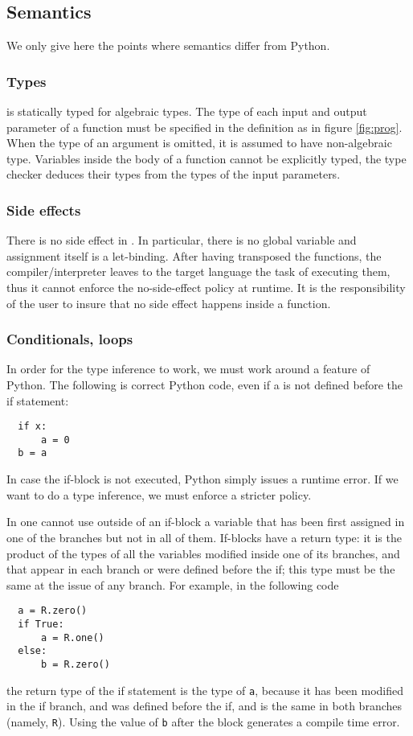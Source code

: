 \ifbfive\pagebreak\fi
\subsection{Semantics}
We only give here the points where \tALpy{} semantics differ from
Python.

\subsubsection{Types}
\tALpy{} is statically typed for algebraic types. The type of each
input and output parameter of a function must be specified in the
definition as in figure \ref{fig:prog}. When the type of an argument
is omitted, it is assumed to have non-algebraic type. Variables inside
the body of a function cannot be explicitly typed, the type checker
deduces their types from the types of the input parameters.

\subsubsection{Side effects}
There is no side effect in \tALpy{}. In particular, there is no global
variable and assignment itself is a let-binding. After having
transposed the functions, the \tALpy{} compiler/interpreter leaves to
the target language the task of executing them, thus it cannot enforce
the no-side-effect policy at runtime. It is the responsibility of the
user to insure that no side effect happens inside a \tALpy{} function.

\subsubsection{Conditionals, loops}
\label{sec:conditionals-loops}
In order for the type inference to work, we must work around a feature
of Python. The following is correct Python code, even if a is not
defined before the if statement:
\begin{lstlisting}
  if x:
      a = 0
  b = a
\end{lstlisting}
In case the if-block is not executed, Python simply issues a runtime
error. If we want to do a type inference, we must enforce a stricter
policy.

In \tALpy{} one cannot use outside of an if-block a variable that has
been first assigned in one of the branches but not in all of them.
If-blocks have a return type: it is the product of the types of all
the variables modified inside one of its branches, and that appear in
each branch or were defined before the if; this type must be the same
at the issue of any branch. For example, in the following code
\begin{lstlisting}
  a = R.zero()
  if True:
      a = R.one()
  else:
      b = R.zero()
\end{lstlisting}
the return type of the if statement is the type of \lstinline{a},
because it has been modified in the if branch, and was defined before
the if, and is the same in both branches (namely,
\lstinline{R}). Using the value of \lstinline{b} after the block
generates a compile time error.

